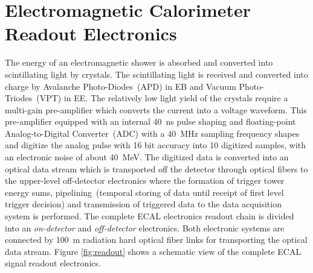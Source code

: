\section{Electromagnetic Calorimeter Readout Electronics}
The energy of an electromagnetic shower is absorbed and converted into scintillating light by \pb crystals. The scintillating light is received and converted into charge by Avalanche Photo-Diodes~(APD) in EB and Vacuum Photo-Triodes~(VPT) in EE. The relatively low light yield of the crystals require a multi-gain pre-amplifier which converts the current into a voltage waveform. 
This pre-amplifier equipped with an internal 40~ns pulse shaping and floating-point Analog-to-Digital Converter~(ADC) with a 40~MHz sampling frequency  shapes and digitize the analog pulse with 16 bit accuracy into 10 digitized samples, with an electronic noise  of about 40~MeV.
The digitized data is converted into an optical data stream which is transported off the detector through optical fibers to the upper-level off-detector electronics where the formation of trigger tower energy sums, pipelining~(temporal storing of data until receipt of first level trigger decision) and transmission of triggered data to the data acquisition system is performed. The complete ECAL electronics readout chain  is divided into an \textit{on-detector} and \textit{off-detector} electronics. Both electronic systems are connected by 100~m radiation hard optical fiber links for transporting the optical data stream. Figure \ref{fig:readout} shows a schematic view of the complete ECAL signal readout electronics.
